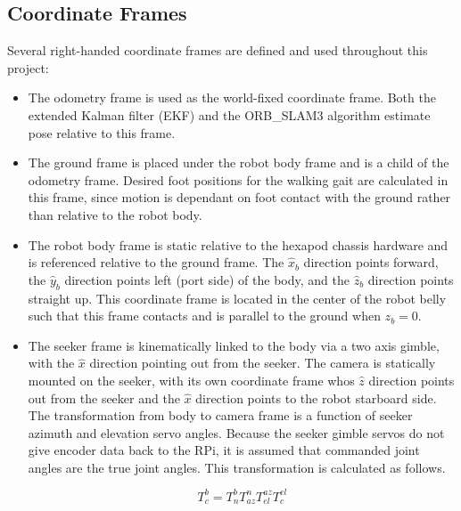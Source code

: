 \documentclass[twocolumn]{article}
\begin{document}
\subsection{ Coordinate Frames }

Several right-handed coordinate frames are defined and used throughout this project:

\begin{itemize}
    \item The odometry frame is used as the world-fixed coordinate frame. Both the extended Kalman filter (EKF) and the ORB\_SLAM3 algorithm estimate pose relative to this frame.

    \item The ground frame is placed under the robot body frame and is a child of the odometry frame. Desired foot positions for the walking gait are calculated in this frame, since motion is dependant on foot contact with the ground rather than relative to the robot body.

    \item The robot body frame is static relative to the hexapod chassis hardware and is referenced relative to the ground frame. The $\hat{x}_b$ direction points forward, the $\hat{y}_b$ direction points left (port side) of the body, and the $\hat{z}_b$ direction points straight up. This coordinate frame is located in the center of the robot belly such that this frame contacts and is parallel to the ground when $z_b = 0$.

    \item The seeker frame is kinematically linked to the body via a two axis gimble, with the $\hat{x}$ direction pointing out from the seeker. The camera is statically mounted on the seeker, with its own coordinate frame whos $\hat{z}$ direction points out from the seeker and the $\hat{x}$ direction points to the robot starboard side. The transformation from body to camera frame is a function of seeker azimuth and elevation servo angles. Because the seeker gimble servos do not give encoder data back to the RPi, it is assumed that commanded joint angles are the true joint angles. This transformation is calculated as follows.

    \[
    T^b_c = T^b_n T^n_{az} T^{az}_{el} T^{el}_{c}
    \]


\end{itemize}
\end{document}
